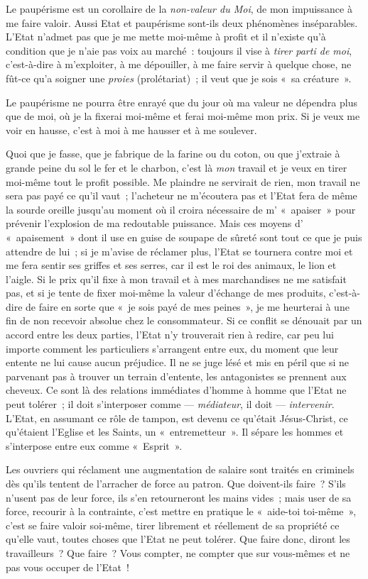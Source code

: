 \documentclass[french,twoside]{book} %
\begin{document}
Le paupérisme est un corollaire de la \emph{non-valeur du Moi}, de mon impuissance à me faire valoir. Aussi Etat et paupérisme sont-ils deux phénomènes inséparables. L’Etat n’admet pas que je me mette moi-même  à profit et il n’existe qu’à condition que je n’aie pas voix au marché : toujours il vise à \emph{tirer parti de moi}, c’est-à-dire à m’exploiter, à me dépouiller, à me faire servir à quelque chose, ne fût-ce qu’a soigner une \emph{proies} (prolétariat) ; il veut que je sois « sa créature ».\par
Le paupérisme ne pourra être enrayé que du jour où ma valeur ne dépendra plus que de moi, où je la fixerai moi-même et ferai moi-même mon prix. Si je veux me voir en hausse, c’est à moi à me hausser et à me soulever.\par
Quoi que je fasse, que je fabrique de la farine ou du coton, ou que j’extraie à grande peine du sol le fer et le charbon, c’est là \emph{mon} travail et je veux en tirer moi-même tout le profit possible. Me plaindre ne servirait de rien, mon travail ne sera pas payé ce qu’il vaut ; l’acheteur ne m’écoutera pas et l’Etat fera de même la sourde oreille jusqu’au moment où il croira nécessaire de m’ « apaiser » pour prévenir l’explosion de ma redoutable puissance. Mais ces moyens d’ « apaisement » dont il use en guise de soupape de sûreté sont tout ce que je puis attendre de lui ; si je m’avise de réclamer plus, l’Etat se tournera contre moi et me fera sentir ses griffes et ses serres, car il est le roi des animaux, le lion et l’aigle. Si le prix qu’il fixe à mon travail et à mes marchandises ne me satisfait pas, et si je tente de fixer moi-même la valeur d’échange de mes produits, c’est-à-dire de faire en sorte que « je sois payé de mes peines », je me heurterai à une fin de non recevoir absolue chez le consommateur. Si ce conflit se dénouait par un accord entre les deux parties, l’Etat n’y trouverait rien à redire, car peu lui importe comment les particuliers s’arrangent entre eux, du moment que leur entente ne lui cause aucun préjudice. Il ne se juge lésé et mis en péril que si ne parvenant pas à trouver un terrain d’entente, les antagonistes se prennent aux cheveux. Ce sont là des relations immédiates d’homme à homme que l’Etat ne peut tolérer ; il doit s’interposer comme — \emph{médiateur},  il doit — \emph{intervenir}. L’Etat, en assumant ce rôle de tampon, est devenu ce qu’était Jésus-Christ, ce qu’étaient l’Eglise et les Saints, un « entremetteur ». Il sépare les hommes et s’interpose entre eux comme « Esprit ».\par
Les ouvriers qui réclament une augmentation de salaire sont traités en criminels dès qu’ils tentent de l’arracher de force au patron. Que doivent-ils faire ? S’ils n’usent pas de leur force, ils s’en retourneront les mains vides ; mais user de sa force, recourir à la contrainte, c’est mettre en pratique le « aide-toi toi-même », c’est se faire valoir soi-même, tirer librement et réellement de sa propriété ce qu’elle vaut, toutes choses que l’Etat ne peut tolérer. Que faire donc, diront les travailleurs ? Que faire ? Vous compter, ne compter que sur vous-mêmes et ne pas vous occuper de l’Etat !\par
\end{document}
